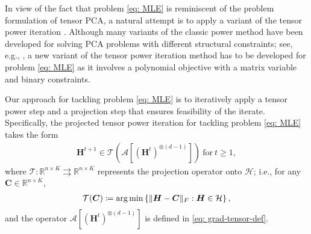 \documentclass{article}
\theoremstyle{plain}
\theoremstyle{definition}
\theoremstyle{remark}
\newcommand{\TCal}{\mathcal{T}}
\newcommand{\ACal}{\mathcal{A}}
\begin{document}
In view of the fact that problem \eqref{eq: MLE} is reminiscent of the problem formulation of tensor PCA, a natural attempt is to apply a variant of the tensor power iteration \citep{richard2014statistical,huang2022power}. Although many variants of the classic power method have been developed for solving PCA problems with different structural constraints; see, e.g., \citet{journee2010generalized,deshpande2014cone,chen2018projected,zhong2018near,zhu2021orthogonal,wang2021non}, a new variant of the tensor power iteration method has to be developed for problem \eqref{eq: MLE} as it involves a polynomial objective with a matrix variable and binary constraints.%

Our approach for tackling problem \eqref{eq: MLE} is to iteratively apply a tensor power step and a projection step that ensures feasibility of the iterate. Specifically, the projected tensor power iteration for tackling problem \eqref{eq: MLE} takes the form
\begin{align}
	\bm{H}^{t+1} \in \TCal \left(\ACal\left[ \left(\bm{H}^{t} \right)^{\otimes (d-1)}\right] \right)~\text{for}~t \geq 1,
\end{align}
where $\mathcal{T}: \mathbb{R}^{n \times K} \rightrightarrows \mathbb{R}^{n \times K}$ represents the projection operator onto $\mathcal{H}$; i.e., for any $\bm{C} \in \mathbb{R}^{n \times K}$,
\begin{align} \label{eq: defprojoperation}
	\mathcal{T}(\bm{C}) \coloneqq {\rm arg} \min \left\{\|\bm{H}-\bm{C}\|_{F}: \bm{H} \in \mathcal{H}\right\},
\end{align}
and the operator $\ACal\left[ \left(\bm{H}^{t} \right)^{\otimes (d-1)}\right]$ is defined in \eqref{eq: grad-tensor-def}.
\end{document}
